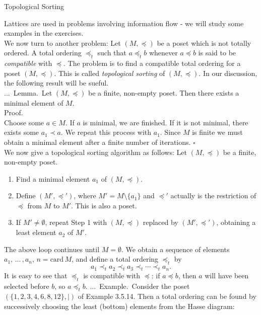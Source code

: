 \documentclass[smaller,hyperref={CJKbookmarks=true}]{beamer}
\newenvironment{PROOF}{{\noindent\!\sf\alert{Proof.}}\\}{\hfill$\square$\\}
\newcounter{zhuo}[subsection]
\renewcommand{\thezhuo}{\thesection.\thesubsection.\arabic{zhuo}}
\newenvironment{EXAMPLE}{\stepcounter{zhuo}\alert{\!\thezhuo.~Example.\,}}{}
\newenvironment{LEMMA}{\stepcounter{zhuo}\alert{\thezhuo.~Lemma.\,}}{}
\begin{document}
\begin{frame}{Topological Sorting}
\begin{spacing}{1.05}
Lattices are used in problems involving information flow - we will study
some examples in the exercises.\\[6pt]
We now turn to another problem: Let $(M,\preccurlyeq)$ be a poset which is not totally ordered. A total ordering $\preccurlyeq_t$ such that $a\preccurlyeq_t b$ whenever $a\preccurlyeq b$ is said to be \emph{compatible} with $\preccurlyeq$. The problem is to find a compatible total ordering for a poset $(M,\preccurlyeq)$. This is called \emph{topological sorting} of $(M,\preccurlyeq)$. In our discussion, the following result will be sueful.\\[6pt]
\begin{LEMMA}
Let $(M,\preccurlyeq)$ be a finite, non-empty poset. Then there exists a minimal element of $M$.\\[6pt]
\begin{PROOF}
Choose some $a\in M$. If $a$ is minimal, we are finished. If it is not minimal, there exists some $a_1\prec a$. We repeat this process with $a_1$. Since $M$ is finite we must obtain a minimal element after a finite number of iterations.
\end{PROOF}
\end{LEMMA}
\newpage
We now give a topological sorting algorithm as follows: Let $(M,\preccurlyeq)$ be a finite, non-empty poset.
\begin{enumerate}[1.]
  \item Find a minimal element $a_1$ of $(M,\preccurlyeq)$.
  \item Define $(M',\preccurlyeq')$, where $M'=M\setminus\{a_1\}$ and $\preccurlyeq'$ actually is the restriction of $\preccurlyeq$ from $M$ to $M'$. This is also a poset.
  \item If $M'\neq\emptyset$, repeat Step 1 with $(M,\preccurlyeq)$ replaced by $(M',\preccurlyeq')$, obtaining a least element $a_2$ of $M'$.
\end{enumerate}
The above loop continues until $M=\emptyset$. We obtain a sequence of elements $a_1,\,...\,,a_n,\,n=\text{card}\,M$, and define a total ordering $\preccurlyeq_t$ by
\[a_1\prec_t a_2\prec_t a_3\prec_t\cdots\prec_t a_n.\]
It is easy to see that $\preccurlyeq_t$ is compatible with $\preccurlyeq$: if $a\preccurlyeq b$, then $a$ will have been selected before $b$, so $a\preccurlyeq_t b$.
\newpage
\begin{EXAMPLE}
Consider the poset $(\{1,2,3,4,6,8,12\},\mid)$ of Example 3.5.14. Then a total ordering can be found by successively choosing the least (bottom) elements from the Hasse diagram:

\end{EXAMPLE}
\end{spacing}
\end{frame}
\end{document}

